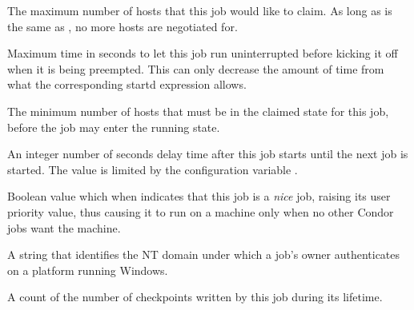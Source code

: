 \begin{description}
\item[\AdAttr{MaxHosts}:]  The maximum number of hosts that this job would
like to claim. As long as  is the same as
, no more hosts are negotiated for.

\item[\AdAttr{MaxJobRetirementTime}:]  Maximum time in seconds to let this
job run uninterrupted before kicking it off when it is being preempted.
This can only decrease the amount of time from what the corresponding
startd expression allows.

\item[\AdAttr{MinHosts}:]  The minimum number of hosts that must be in
the claimed state for this job, before the job may enter the running state.

\item[\AdAttr{NextJobStartDelay}:]  An integer number of seconds delay time
after this job starts until the next job is started. The value is limited
by the configuration variable .

\item[\AdAttr{NiceUser}:]  Boolean value which when  indicates
that this job is a \emph{nice} job, raising its user priority value, 
thus causing it to run on a machine only when no other Condor jobs want 
the machine.

\item[\AdAttr{NTDomain}:]  A string that identifies the NT domain under
which a job's owner authenticates on a platform running Windows.

\item[\AdAttr{NumCkpts}:]  A count of the number of checkpoints
written by this job during its lifetime.


\end{description}
